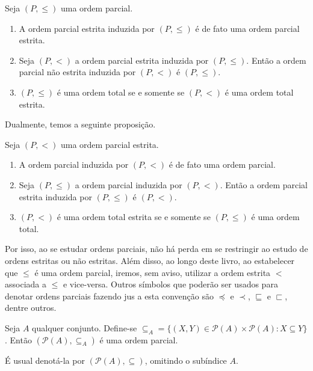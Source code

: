 \begin{proposition}[$\BST$]\label{prop:ordensEstritasInduzidas}
    Seja $(P, \leq)$ uma ordem parcial.
    \begin{enumerate}[label=(\alph*)]
        \item A ordem parcial estrita induzida por $(P, \leq)$ é de fato uma ordem parcial estrita.
        \item Seja $(P, <)$ a ordem parcial estrita induzida por $(P, \leq)$.
        Então a ordem parcial não estrita induzida por $(P, <)$ é $(P, \leq)$.
        \item $(P, \leq)$ é uma ordem total se e somente se $(P, <)$ é uma ordem total estrita.
    \end{enumerate}
\end{proposition}

Dualmente, temos a seguinte proposição.

\begin{proposition}[$\BST$]\label{prop:ordensNaoEstritasInduzidas}
    Seja $(P, <)$ uma ordem parcial estrita.
    \begin{enumerate}[label=(\alph*)]
        \item A ordem parcial induzida por $(P, <)$ é de fato uma ordem parcial.
        \item Seja $(P, \leq)$ a ordem parcial induzida por $(P, <)$.
        Então a ordem parcial estrita induzida por $(P, \leq)$ é $(P, <)$.
        \item $(P, <)$ é uma ordem total estrita se e somente se $(P, \leq)$ é uma ordem total.
    \end{enumerate}
\end{proposition}

Por isso, ao se estudar ordens parciais, não há perda em se restringir ao estudo de ordens estritas ou não estritas.
Além disso, ao longo deste livro, ao estabelecer que $\leq$ é uma ordem parcial, iremos, sem aviso, utilizar a ordem estrita $<$ associada a $\leq$ e vice-versa.
Outros símbolos que poderão ser usados para denotar ordens parciais fazendo jus a esta convenção são $\preceq$ e $\prec$, $\sqsubseteq$ e $\sqsubset$, dentre outros.

\begin{example}[$\BST$]\label{exa:ordemParcialDasPartes}
    Seja $A$ qualquer conjunto.
    Define-se $\subseteq_A=\{(X, Y) \in \mathcal{P}(A) \times \mathcal{P}(A) : X \subseteq Y\}$.
    Então $(\mathcal{P}(A), \subseteq_A)$ é uma ordem parcial.
    
    É usual denotá-la por $(\mathcal{P}(A), \subseteq)$, omitindo o subíndice $A$.
\end{example}


